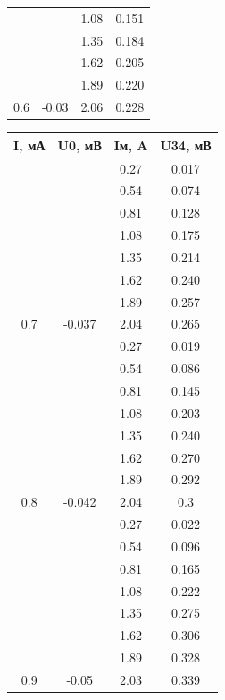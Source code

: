 \documentclass[11pt]{article}
\begin{document}
\begin{figure}[H]
\begin{subfigure}{.5\textwidth}
\begin{tabular}{|c|c|c|c|}
        & & 1.08 & 0.151  \\
        & & 1.35 & 0.184  \\
        & & 1.62 & 0.205  \\
        & & 1.89 & 0.220  \\
        \multirow{-8}{*}{0.6}         & \multirow{-8}{*}{-0.03}        & 2.06 & 0.228  \\\hline
    \end {tabular}
    \end{subfigure}%
    \begin{subfigure}{.5\textwidth}
        \centering
    \begin{tabular}{|c|c|c|c|}
        \hline
        I, мА & U0, мВ & Iм, A & U34, мВ \\\hline
        & & 0.27 & 0.017  \\
        & & 0.54 & 0.074  \\
        & & 0.81 & 0.128  \\
        & & 1.08 & 0.175  \\
        & & 1.35 & 0.214  \\
        & & 1.62 & 0.240  \\
        & & 1.89 & 0.257  \\
        \multirow{-8}{*}{0.7}         & \multirow{-8}{*}{-0.037}       & 2.04 & 0.265  \\\hline
        & & 0.27 & 0.019  \\ 
        & & 0.54 & 0.086  \\ 
        & & 0.81 & 0.145  \\ 
        & & 1.08 & 0.203  \\ 
        & & 1.35 & 0.240  \\ 
        & & 1.62 & 0.270  \\ 
        & & 1.89 & 0.292  \\ 
        \multirow{-8}{*}{0.8}         & \multirow{-8}{*}{-0.042}       & 2.04 & 0.3    \\\hline
        & & 0.27 & 0.022  \\ 
        & & 0.54 & 0.096  \\ 
        & & 0.81 & 0.165  \\ 
        & & 1.08 & 0.222  \\ 
        & & 1.35 & 0.275  \\ 
        & & 1.62 & 0.306  \\ 
        & & 1.89 & 0.328  \\ 
        \multirow{-8}{*}{0.9}         & \multirow{-8}{*}{-0.05}        & 2.03 & 0.339  \\\hline

\end{tabular}
\end{subfigure}
\end{figure}
\end{document}
